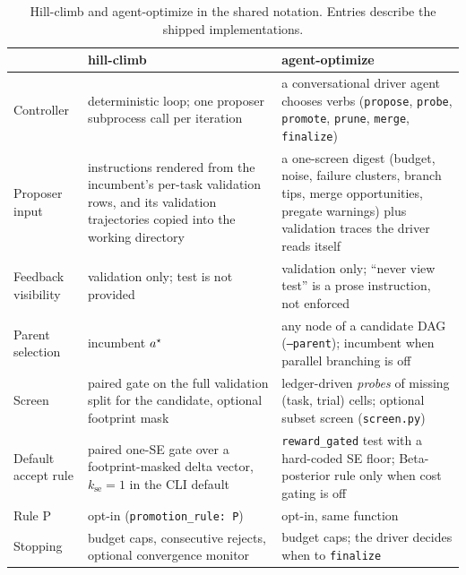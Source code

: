 \begin{table}[h]
\centering\small
\caption{Hill-climb and agent-optimize in the shared notation. Entries describe the shipped implementations.}
\label{tab:method:algs}
\footnotesize\begin{tabular}{p{1.9cm}p{4.4cm}p{4.4cm}}
\toprule
 & hill-climb & agent-optimize \\
\midrule
Controller & deterministic loop; one proposer subprocess call per iteration & a conversational driver agent chooses verbs (\texttt{propose}, \texttt{probe}, \texttt{promote}, \texttt{prune}, \texttt{merge}, \texttt{finalize}) \\
Proposer input & instructions rendered from the incumbent's per-task validation rows, and its validation trajectories copied into the working directory & a one-screen digest (budget, noise, failure clusters, branch tips, merge opportunities, pregate warnings) plus validation traces the driver reads itself \\
Feedback visibility & validation only; test is not provided & validation only; ``never view test'' is a prose instruction, not enforced \\
Parent selection & incumbent $a^\star$ & any node of a candidate DAG (\texttt{--parent}); incumbent when parallel branching is off \\
Screen & paired gate on the full validation split for the candidate, optional footprint mask & ledger-driven \emph{probes} of missing (task, trial) cells; optional subset screen (\texttt{screen.py}) \\
Default accept rule & paired one-SE gate over a footprint-masked delta vector, $k_{\mathrm{se}}=1$ in the CLI default & \texttt{reward\_gated} test with a hard-coded SE floor; Beta-posterior rule only when cost gating is off \\
Rule P & opt-in (\texttt{promotion\_\allowbreak rule: P}) & opt-in, same function \\
Stopping & budget caps, consecutive rejects, optional convergence monitor & budget caps; the driver decides when to \texttt{finalize} \\
\bottomrule
\end{tabular}
\end{table}

